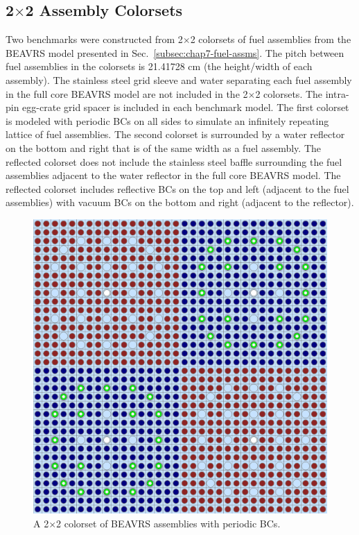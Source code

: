 \subsection{2$\times$2 Assembly Colorsets}
\label{subsec:chap7-2x2-colorsets}

Two benchmarks were constructed from 2$\times$2 colorsets of fuel assemblies from the \ac{BEAVRS} model presented in Sec.~\ref{subsec:chap7-fuel-assms}. The pitch between fuel assemblies in the colorsets is 21.41728 cm (the height/width of each assembly). The stainless steel grid sleeve and water separating each fuel assembly in the full core \ac{BEAVRS} model are not included in the 2$\times$2 colorsets. The intra-pin egg-crate grid spacer is included in each benchmark model. The first colorset is modeled with periodic \acp{BC} on all sides to simulate an infinitely repeating lattice of fuel assemblies. The second colorset is surrounded by a water reflector on the bottom and right that is of the same width as a fuel assembly. The reflected colorset does not include the stainless steel baffle surrounding the fuel assemblies adjacent to the water reflector in the full core \ac{BEAVRS} model. The reflected colorset includes reflective \acp{BC} on the top and left (adjacent to the fuel assemblies) with vacuum \acp{BC} on the bottom and right (adjacent to the reflector).

\begin{figure}[h!]
  \centering
  \includegraphics[width=0.63\linewidth]{figures/benchmarks/2x2}
\vspace{2mm}
\caption[A 2$\times$2 colorset of BEAVRS assemblies]{A 2$\times$2 colorset of BEAVRS assemblies with periodic BCs.}
\label{fig:chap7-2x2}
\end{figure}

